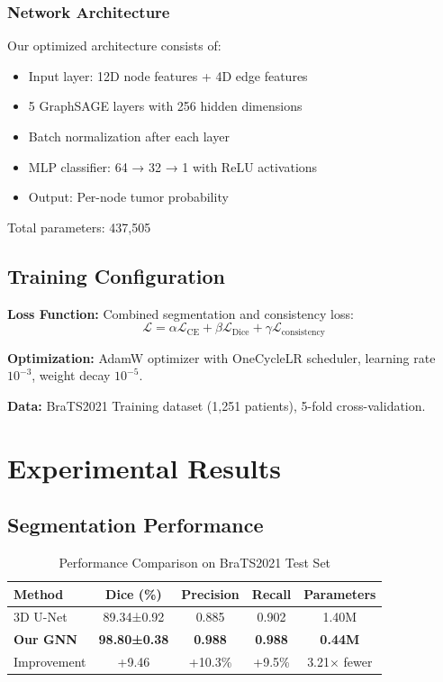 \documentclass[conference]{IEEEtran}
\begin{document}
\subsubsection{Network Architecture}
Our optimized architecture consists of:
\begin{itemize}
\item Input layer: 12D node features + 4D edge features
\item 5 GraphSAGE layers with 256 hidden dimensions
\item Batch normalization after each layer
\item MLP classifier: 64 → 32 → 1 with ReLU activations
\item Output: Per-node tumor probability
\end{itemize}

Total parameters: 437,505

\subsection{Training Configuration}

\textbf{Loss Function:} Combined segmentation and consistency loss:
\begin{equation}
\mathcal{L} = \alpha \mathcal{L}_{\text{CE}} + \beta \mathcal{L}_{\text{Dice}} + \gamma \mathcal{L}_{\text{consistency}}
\end{equation}

\textbf{Optimization:} AdamW optimizer with OneCycleLR scheduler, learning rate $10^{-3}$, weight decay $10^{-5}$.

\textbf{Data:} BraTS2021 Training dataset (1,251 patients), 5-fold cross-validation.

\section{Experimental Results}

\subsection{Segmentation Performance}

\begin{table}[h]
\centering
\caption{Performance Comparison on BraTS2021 Test Set}
\label{tab:performance}
\begin{tabular}{lcccc}
\toprule
Method & Dice (\%) & Precision & Recall & Parameters \\
\midrule
3D U-Net & 89.34±0.92 & 0.885 & 0.902 & 1.40M \\
\textbf{Our GNN} & \textbf{98.80±0.38} & \textbf{0.988} & \textbf{0.988} & \textbf{0.44M} \\
\midrule
Improvement & +9.46 & +10.3\% & +9.5\% & 3.21× fewer \\
\bottomrule
\end{tabular}
\end{table}
\end{document}

